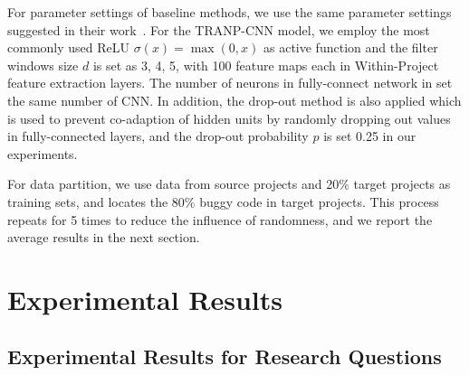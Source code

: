 For parameter settings of baseline methods, we use the same parameter settings suggested in their work~\cite{rao2011retrieval}. For the TRANP-CNN model, we employ the most commonly used ReLU $\sigma(x)=\max(0,x)$ as active function and the filter windows size $d$ is set as 3, 4, 5, with 100 feature maps each in Within-Project feature extraction layers. The number of neurons in fully-connect network in  set the same number of CNN. In addition, the drop-out method is also applied which is used to prevent co-adaption of hidden units by randomly dropping out values in fully-connected layers, and the drop-out probability $p$ is set 0.25 in our experiments.

For data partition, we use data from source projects and 20\% target projects as training sets, and locates the 80\% buggy code in target projects. This process repeats for 5 times to reduce the influence of randomness, and we report the average results in the next section.

\section{Experimental Results}

\subsection{Experimental Results for Research Questions}

